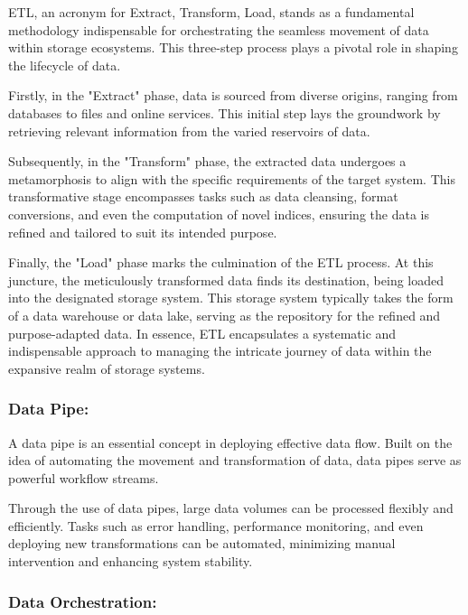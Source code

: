 ETL, an acronym for Extract, Transform, Load, stands as a fundamental methodology indispensable for orchestrating the seamless movement of data within storage ecosystems. This three-step process plays a pivotal role in shaping the lifecycle of data.

Firstly, in the "Extract" phase, data is sourced from diverse origins, ranging from databases to files and online services. This initial step lays the groundwork by retrieving relevant information from the varied reservoirs of data.

Subsequently, in the "Transform" phase, the extracted data undergoes a metamorphosis to align with the specific requirements of the target system. This transformative stage encompasses tasks such as data cleansing, format conversions, and even the computation of novel indices, ensuring the data is refined and tailored to suit its intended purpose.

Finally, the "Load" phase marks the culmination of the ETL process. At this juncture, the meticulously transformed data finds its destination, being loaded into the designated storage system. This storage system typically takes the form of a data warehouse or data lake, serving as the repository for the refined and purpose-adapted data. In essence, ETL encapsulates a systematic and indispensable approach to managing the intricate journey of data within the expansive realm of storage systems.

\subsubsection*{Data Pipe:}

A data pipe is an essential concept in deploying effective data flow. Built on the idea of automating the movement and transformation of data, data pipes serve as powerful workflow streams.

Through the use of data pipes, large data volumes can be processed flexibly and efficiently. Tasks such as error handling, performance monitoring, and even deploying new transformations can be automated, minimizing manual intervention and enhancing system stability.


\subsubsection*{Data Orchestration:}

